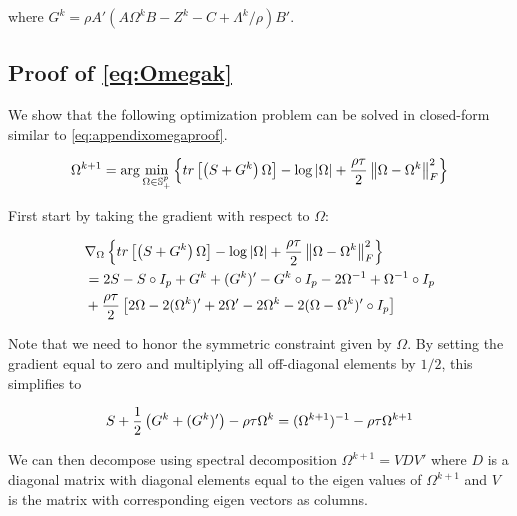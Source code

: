 \documentclass[11pt,]{report}
\theoremstyle{definition}
\theoremstyle{definition}
\theoremstyle{definition}
\theoremstyle{remark}
\begin{document}
where \(G^{k} = \rho A'(A\Omega^{k}B - Z^{k} - C + \Lambda^{k}/\rho)B'\).

\hypertarget{proofOmegak}{%
\subsection{Proof of \eqref{eq:Omegak}}\label{proofOmegak}}

We show that the following optimization problem can be solved in closed-form similar to \eqref{eq:appendixomegaproof}.

\begin{equation}
\Omega^{k + 1} = \arg\min_{\Omega \in \mathbb{S}_{+}^{p}}\left\{tr\left[\left(S + G^{k}\right)\Omega\right] - \log\left|\Omega\right| + \frac{\rho\tau}{2}\left\|\Omega - \Omega^{k}\right\|_{F}^{2} \right\}
\label{eq:appendixomegaloglik2}\notag
\end{equation}

First start by taking the gradient with respect to \(\Omega\):

\begin{equation}
\begin{split}
  &\nabla_{\Omega}\left\{tr\left[\left(S + G^{k}\right)\Omega\right] - \log\left|\Omega\right| + \frac{\rho\tau}{2}\left\|\Omega - \Omega^{k}\right\|_{F}^{2} \right\} \\
  &= 2S - S\circ I_{p} + G^{k} + (G^{k})' - G^{k}\circ I_{p} - 2\Omega^{-1} + \Omega^{-1}\circ I_{p} \\
  &+ \frac{\rho\tau}{2}\left[2\Omega - 2(\Omega^{k})' + 2\Omega' - 2\Omega^{k} - 2(\Omega - \Omega^{k})'\circ I_{p} \right]
\label{eq:appendixomegagradient2}\notag
\end{split}
\end{equation}

Note that we need to honor the symmetric constraint given by \(\Omega\). By setting the gradient equal to zero and multiplying all off-diagonal elements by \(1/2\), this simplifies to

\begin{equation}
S + \frac{1}{2}\left(G^{k} + (G^{k})'\right) - \rho\tau\Omega^{k} = (\Omega^{k + 1})^{-1} - \rho\tau\Omega^{k + 1} \notag
\end{equation}

We can then decompose using spectral decomposition \(\Omega^{k + 1} = VDV'\) where \(D\) is a diagonal matrix with diagonal elements equal to the eigen values of \(\Omega^{k + 1}\) and \(V\) is the matrix with corresponding eigen vectors as columns.
\end{document}
